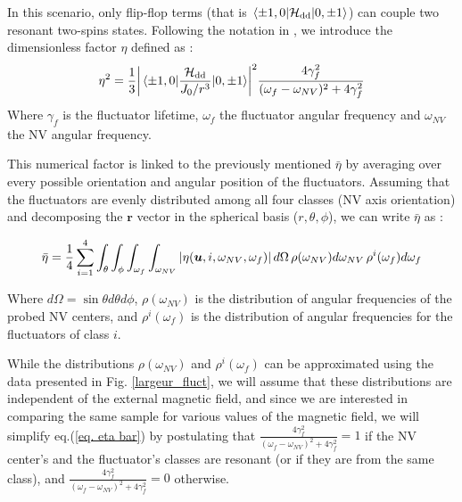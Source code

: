 \documentclass[preprintnumbers,amsmath,amssymb,onecolumn,12pt]{revtex4-2}\usepackage{graphicx}%
\begin{document}
In this scenario, only flip-flop terms (that is $\mel{\pm 1,0}{\mathcal{H}_{\rm dd}}{0,\pm 1}$) can couple two resonant two-spins states. Following the notation in \cite{choi_depolarization_2017}, we introduce the dimensionless factor $\eta$ defined as : 
\begin{equation}
\eta^2=\frac{1}{3} \abs{\mel{\pm 1,0}{\frac{\mathcal{H}_{\rm dd}}{J_0/r^3}}{0,\pm 1}}^2  \frac{4\gamma_f^2}{(\omega_f - \omega_{NV})^2+4\gamma_f^2}
\end{equation}
Where $\gamma_f$ is the fluctuator lifetime, $\omega_f$ the fluctuator angular frequency and $\omega_{NV}$ the NV angular frequency. %

This numerical factor is linked to the previously mentioned $\bar \eta$ by averaging over every possible orientation and angular position of the fluctuators. Assuming that the fluctuators are evenly distributed among all four classes (NV axis orientation) and decomposing the $\bm r$ vector in the spherical basis ($r, \theta, \phi$), we can write $\bar \eta$ as :

\begin{equation}
\label{eq. eta bar}
\bar \eta =\frac{1}{4} \sum_{i=1}^4 \int_\theta \int_\phi  \int_{\omega_f} \int_{\omega_{NV}}   \abs{\eta(\bm u,i,\omega_{NV},\omega_f)}\, d\Omega\, \rho(\omega_{NV}) d\omega_{NV}\, \rho^i(\omega_f) d\omega_f 
\end{equation}

Where $d\Omega=\sin \theta d\theta d\phi$, $\rho(\omega_{NV})$ is the distribution of angular frequencies of the probed NV centers, and  $\rho^i(\omega_f)$ is the distribution of angular frequencies  for the fluctuators of class $i$.

While the distributions $\rho(\omega_{NV})$ and $\rho^i(\omega_f)$ can be approximated using the data presented in Fig. \ref{largeur_fluct}, we will assume that these distributions are independent of the external magnetic field, and since we are interested in comparing the same sample for various values of the magnetic field, we will simplify eq.(\ref{eq. eta bar}) by postulating that $\frac{4\gamma_f^2}{(\omega_f - \omega_{NV})^2+4\gamma_f^2} =1$ if the NV center's and the fluctuator's classes are resonant (or if they are from the same class), and $\frac{4\gamma_f^2}{(\omega_f - \omega_{NV})^2 +4\gamma_f^2}=0$ otherwise.
\end{document}
